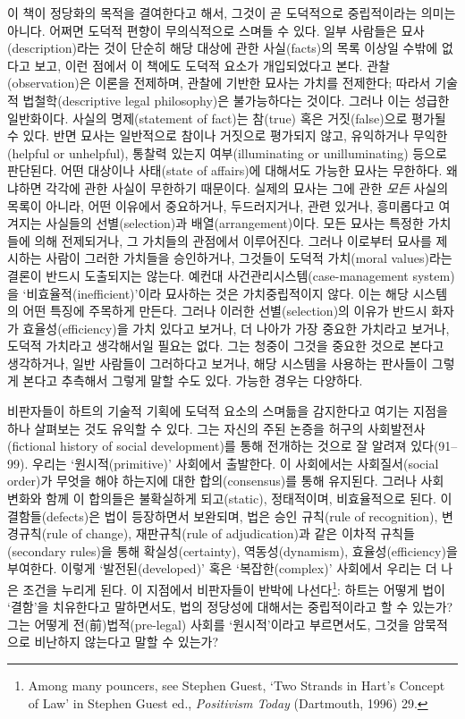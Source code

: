 \documentclass[12pt, oneside]{book}  %
\begin{document}
이 책이 정당화의 목적을 결여한다고 해서, 그것이 곧 도덕적으로
중립적이라는 의미는 아니다. 어쩌면 도덕적 편향이 무의식적으로 스며들 수
있다. 일부 사람들은 묘사(description)라는 것이 단순히 해당 대상에 관한
사실(facts)의 목록 이상일 수밖에 없다고 보고, 이런 점에서 이 책에도
도덕적 요소가 개입되었다고 본다. 관찰(observation)은 이론을 전제하며,
관찰에 기반한 묘사는 가치를 전제한다; 따라서 기술적 법철학(descriptive
legal philosophy)은 불가능하다는 것이다. 그러나 이는 성급한 일반화이다.
사실의 명제(statement of fact)는 참(true) 혹은 거짓(false)으로 평가될 수
있다. 반면 묘사는 일반적으로 참이나 거짓으로 평가되지 않고, 유익하거나
무익한(helpful or unhelpful), 통찰력 있는지 여부(illuminating or
unilluminating) 등으로 판단된다. 어떤 대상이나 사태(state of affairs)에
대해서도 가능한 묘사는 무한하다. 왜냐하면 각각에 관한 사실이 무한하기
때문이다. 실제의 묘사는 그에 관한 \emph{모든} 사실의 목록이 아니라, 어떤
이유에서 중요하거나, 두드러지거나, 관련 있거나, 흥미롭다고 여겨지는
사실들의 선별(selection)과 배열(arrangement)이다. 모든 묘사는 특정한
가치들에 의해 전제되거나, 그 가치들의 관점에서 이루어진다. 그러나
이로부터 묘사를 제시하는 사람이 그러한 가치들을 승인하거나, 그것들이
도덕적 가치(moral values)라는 결론이 반드시 도출되지는 않는다. 예컨대
사건관리시스템(case-management system)을 `비효율적(inefficient)'이라
묘사하는 것은 가치중립적이지 않다. 이는 해당 시스템의 어떤 특징에
주목하게 만든다. 그러나 이러한 선별(selection)의 이유가 반드시 화자가
효율성(efficiency)을 가치 있다고 보거나, 더 나아가 가장 중요한 가치라고
보거나, 도덕적 가치라고 생각해서일 필요는 없다. 그는 청중이 그것을
중요한 것으로 본다고 생각하거나, 일반 사람들이 그러하다고 보거나, 해당
시스템을 사용하는 판사들이 그렇게 본다고 추측해서 그렇게 말할 수도 있다.
가능한 경우는 다양하다.

비판자들이 하트의 기술적 기획에 도덕적 요소의 스며듦을 감지한다고 여기는
지점을 하나 살펴보는 것도 유익할 수 있다. 그는 자신의 주된 논증을 허구의
사회발전사(fictional history of social development)를 통해 전개하는
것으로 잘 알려져 있다(91--99). 우리는 `원시적(primitive)' 사회에서
출발한다. 이 사회에서는 사회질서(social order)가 무엇을 해야 하는지에
대한 합의(consensus)를 통해 유지된다. 그러나 사회 변화와 함께 이
합의들은 불확실하게 되고(static), 정태적이며, 비효율적으로 된다. 이
결함들(defects)은 법이 등장하면서 보완되며, 법은 승인 규칙(rule of
recognition), 변경규칙(rule of change), 재판규칙(rule of adjudication)과
같은 이차적 규칙들(secondary rules)을 통해 확실성(certainty),
역동성(dynamism), 효율성(efficiency)을 부여한다. 이렇게
`발전된(developed)' 혹은 `복잡한(complex)' 사회에서 우리는 더 나은
조건을 누리게 된다. 이 지점에서 비판자들이 반박에 나선다\footnote{Among
  many pouncers, see Stephen Guest, `Two Strands in Hart's Concept of
  Law' in Stephen Guest ed., \emph{Positivism Today} (Dartmouth, 1996)
  29.}: 하트는 어떻게 법이 `결함'을 치유한다고 말하면서도, 법의 정당성에
대해서는 중립적이라고 할 수 있는가? 그는 어떻게 전(前)법적(pre-legal)
사회를 `원시적'이라고 부르면서도, 그것을 암묵적으로 비난하지 않는다고
말할 수 있는가?
\end{document}

